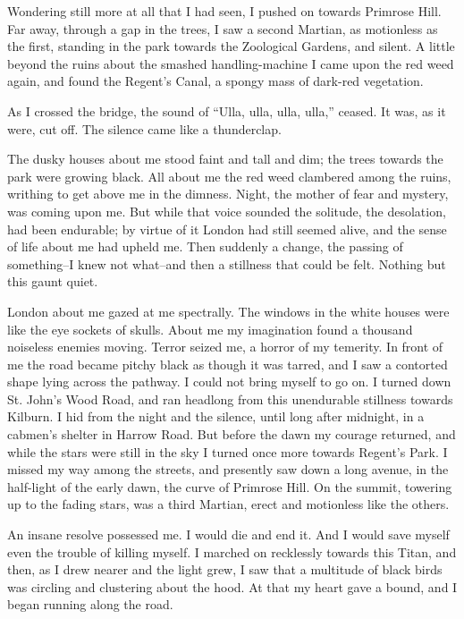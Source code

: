 Wondering still more at all that I had seen, I pushed on towards
Primrose Hill. Far away, through a gap in the trees, I saw a second
Martian, as motionless as the first, standing in the park towards
the Zoological Gardens, and silent. A little beyond the ruins about
the smashed handling-machine I came upon the red weed again, and
found the Regent's Canal, a spongy mass of dark-red vegetation.

As I crossed the bridge, the sound of ``Ulla, ulla, ulla, ulla,''
ceased. It was, as it were, cut off. The silence came like a
thunderclap.

The dusky houses about me stood faint and tall and dim; the trees
towards the park were growing black. All about me the red weed
clambered among the ruins, writhing to get above me in the dimness.
Night, the mother of fear and mystery, was coming upon me. But
while that voice sounded the solitude, the desolation, had been
endurable; by virtue of it London had still seemed alive, and the
sense of life about me had upheld me. Then suddenly a change, the
passing of something--I knew not what--and then a stillness that
could be felt. Nothing but this gaunt quiet.

London about me gazed at me spectrally. The windows in the white
houses were like the eye sockets of skulls. About me my imagination
found a thousand noiseless enemies moving. Terror seized me, a
horror of my temerity. In front of me the road became pitchy black
as though it was tarred, and I saw a contorted shape lying across
the pathway. I could not bring myself to go on. I turned down St.
John's Wood Road, and ran headlong from this unendurable stillness
towards Kilburn. I hid from the night and the silence, until long
after midnight, in a cabmen's shelter in Harrow Road. But before
the dawn my courage returned, and while the stars were still in the
sky I turned once more towards Regent's Park. I missed my way among
the streets, and presently saw down a long avenue, in the
half-light of the early dawn, the curve of Primrose Hill. On the
summit, towering up to the fading stars, was a third Martian, erect
and motionless like the others.

An insane resolve possessed me. I would die and end it. And I would
save myself even the trouble of killing myself. I marched on
recklessly towards this Titan, and then, as I drew nearer and the
light grew, I saw that a multitude of black birds was circling and
clustering about the hood. At that my heart gave a bound, and I
began running along the road.

